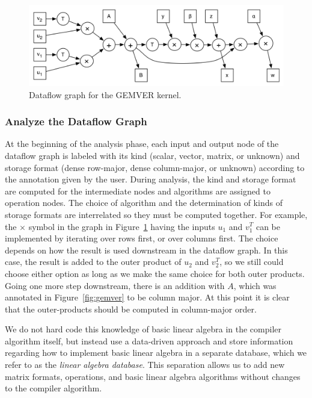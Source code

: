 \documentclass[runningheads]{llncs}
\begin{document}
\begin{figure}[htbp]
\centering
\includegraphics[width=.7\textwidth]{figures/gemver-dataflow.png}
 
\caption{Dataflow graph for the GEMVER kernel.}
\label{fig:gemver-dataflow}
\end{figure}

\subsubsection{Analyze the Dataflow Graph}

At the beginning of the analysis phase, each input and output node of the dataflow graph is labeled with its kind (scalar, vector, matrix, or unknown) and storage format (dense row-major, dense column-major, or unknown) according to the annotation given by the user.  During analysis, the kind and storage format are computed for the intermediate nodes and algorithms are assigned to operation nodes. The choice of algorithm and the determination of kinds of storage formats are interrelated so they must be computed together.  For example, the $\times$ symbol in the graph in Figure~\ref{fig:gemver-dataflow} having the inputs $u_1$ and $v_1^T$ can be implemented by iterating over rows first, or over columns first. The choice depends on how the result is used downstream in the dataflow graph.  In this case, the result is added to the outer product of $u_2$ and $v_2^T$, so we still could choose either option as long as we make the same choice for both outer products. Going one more step downstream, there is an addition with $A$, which was annotated in Figure~\ref{fig:gemver} to be column major. At this point it is clear that the outer-products should be computed in column-major order.

We do not hard code this knowledge of basic linear algebra in the compiler algorithm itself, but instead use a data-driven approach and store information regarding how to implement basic linear algebra in a separate database, which we refer to as the \emph{linear algebra database}.  This separation allows us to add new matrix formats, operations, and basic linear algebra algorithms without changes to the
compiler algorithm. 
\end{document}
